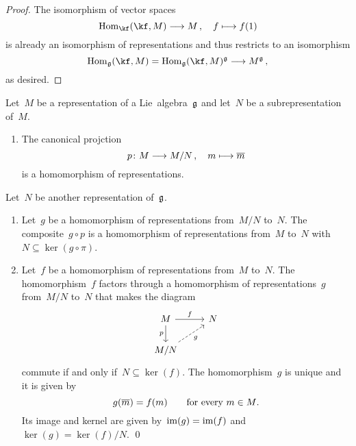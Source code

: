 \begin{proof}
  The isomorphism of vector spaces
  \[
    \Hom_{\kf}(\kf, M)
    \to
    M \,,
    \quad
    f
    \mapsto
    f(1)
  \]
  is already an isomorphism of representations and thus restricts to an isomorphism
  \[
    \Hom_{\glie}(\kf, M)
    =
    \Hom_{\glie}(\kf, M)^{\glie}
    \to
    M^{\glie} \,,
  \]
  as desired.
\end{proof}


\begin{proposition}
  \label{homomorphism theorem!for representations}
  Let~$M$ be a representation of a Lie~algebra~$\mathfrak{g}$ and let~$N$ be a subrepresentation of~$M$.
  \begin{enumerate}
    \item
      The canonical projction
      \[
        p
        \colon
        M
        \to
        M/N \,,
        \quad
        m
        \mapsto
        \class{m}
      \]
      is a homomorphism of representations. 
  \end{enumerate}
  Let~$N$ be another representation of~$\mathfrak{g}$.
  \begin{enumerate}[resume*]
    \item
      Let~$g$ be a homomorphism of representations from~$M/N$ to~$N$.
      The composite~$g \circ p$ is a homomorphism of representations from~$M$ to~$N$ with~$N \subseteq \ker(g \circ \pi)$.
    \item
      Let~$f$ be a homomorphism of representations from~$M$ to~$N$.
      The homomorphism~$f$ factors through a homomorphism of representations~$g$ from~$M/N$ to~$N$ that makes the diagram
      \[
        \begin{tikzcd}
          M
          \arrow{r}[above]{f}
          \arrow{d}[left]{p}
          &
          N
          \\
          M/N
          \arrow[dashed]{ur}[below right]{g}
          &
          {}
        \end{tikzcd}
      \]
      commute if and only if~$N \subseteq \ker(f)$.
      The homomorphism~$g$ is unique and it is given by
      \[
        g(\overline{m}) = f(m)
        \qquad
        \text{for every~$m \in M$.}
      \]
      Its image and kernel are given by~$\operatorname{im}(g) = \operatorname{im}(f)$ and~$\ker(g) = \ker(f)/N$.
    \qed
  \end{enumerate}
\end{proposition}


